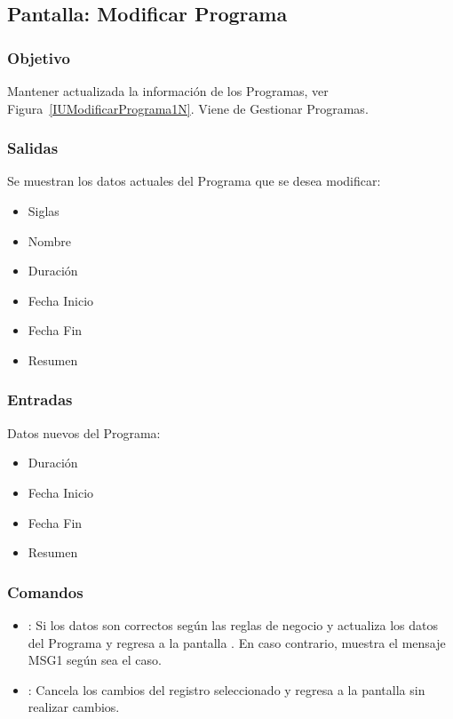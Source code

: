 \subsection{Pantalla: Modificar Programa}

\subsubsection{Objetivo}
	Mantener actualizada la información de los Programas, ver Figura~\ref{IUModificarPrograma1N}. Viene de Gestionar Programas.


\subsubsection{Salidas}
	Se muestran los datos actuales del Programa que se desea modificar:
\begin{itemize}
	\item Siglas
	\item Nombre
	\item Duración
	\item Fecha Inicio
	\item Fecha Fin
	\item Resumen
\end{itemize}

\subsubsection{Entradas}
Datos nuevos del Programa:
\begin{itemize}
	\item Duración
	\item Fecha Inicio
	\item Fecha Fin
	\item Resumen
\end{itemize}

\subsubsection{Comandos}
\begin{itemize}
 	\item {}: Si los datos son correctos según las reglas de negocio  y  actualiza los datos del Programa y regresa a la pantalla . En caso contrario, muestra el mensaje MSG1 según sea el caso.
 	\item {}: Cancela los cambios del registro seleccionado y regresa a la pantalla  sin realizar cambios.
\end{itemize}
